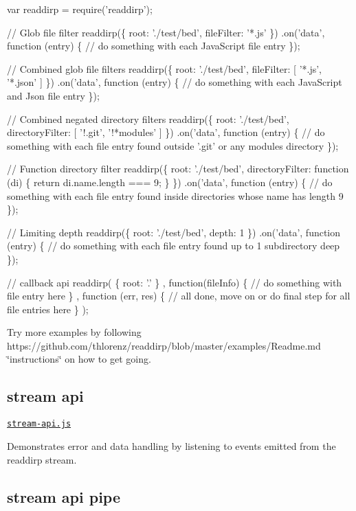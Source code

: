 \begin{DoxyCode}
var readdirp = require('readdirp');

// Glob file filter
readdirp(\{ root: './test/bed', fileFilter: '*.js' \})
  .on('data', function (entry) \{
    // do something with each JavaScript file entry
  \});

// Combined glob file filters
readdirp(\{ root: './test/bed', fileFilter: [ '*.js', '*.json' ] \})
  .on('data', function (entry) \{
    // do something with each JavaScript and Json file entry 
  \});

// Combined negated directory filters
readdirp(\{ root: './test/bed', directoryFilter: [ '!.git', '!*modules' ] \})
  .on('data', function (entry) \{
    // do something with each file entry found outside '.git' or any modules directory 
  \});

// Function directory filter
readdirp(\{ root: './test/bed', directoryFilter: function (di) \{ return di.name.length === 9; \} \})
  .on('data', function (entry) \{
    // do something with each file entry found inside directories whose name has length 9
  \});

// Limiting depth
readdirp(\{ root: './test/bed', depth: 1 \})
  .on('data', function (entry) \{
    // do something with each file entry found up to 1 subdirectory deep
  \});

// callback api
readdirp(
    \{ root: '.' \}
  , function(fileInfo) \{ 
      // do something with file entry here
    \} 
  , function (err, res) \{
      // all done, move on or do final step for all file entries here
    \}
);
\end{DoxyCode}


Try more examples by following https\+://github.com/thlorenz/readdirp/blob/master/examples/\+Readme.\+md \char`\"{}instructions\char`\"{} on how to get going.

\subsection*{stream api}

\href{https://github.com/thlorenz/readdirp/blob/master/examples/stream-api.js}{\tt stream-\/api.\+js}

Demonstrates error and data handling by listening to events emitted from the readdirp stream.

\subsection*{stream api pipe}

